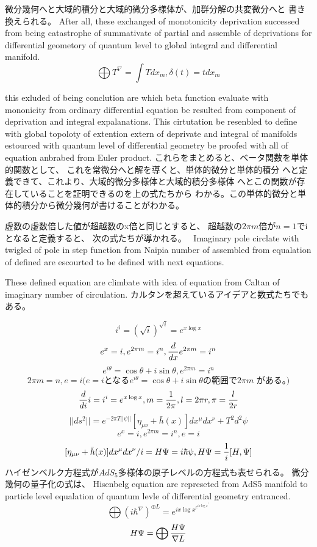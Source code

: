 \documentclass{jsarticle}
\begin{document}
   微分幾何へと大域的積分と大域的微分多様体が、加群分解の共変微分へと
   書き換えられる。
   After all, these exchanged of monotonicity deprivation successed from
   being catastrophe of summativate of partial and assemble of deprivations
   for differential geometory of quantum level to global integral and
   differential manifold.
   $$ \bigoplus T^{\nabla}  = \int T dx_m, \delta(t) = t dx_m  $$


   this exluded of being conclution are which beta function
   evaluate with mononicity from ordinary differential equation
   be resulted from component of deprivation and integral expalanations.
   This cirtutation be resenbled to define with global topoloty of
   extention extern of deprivate and integral of manifolds
   estourced with quantum level of differential geometry be proofed with
   all of equation anbrabed from Euler product.
   これらをまとめると、ベータ関数を単体的関数として、
   これを常微分へと解を導くと、単体的微分と単体的積分
   へと定義できて、これより、大域的微分多様体と大域的積分多様体
   へとこの関数が存在していることを証明できるのを上の式たちから
   わかる。この単体的微分と単体的積分から微分幾何が書けることがわかる。



   虚数の虚数倍した値が超越数のx倍と同じとすると、
   超越数の$2 \pi m$倍が$n=1$でiとなると定義すると、
   次の式たちが導かれる。　
   Imaginary pole circlate with twigled of pole in step function
   from Naipia number of assembled from equalation of defined are
   escourted to be defined with next equations.


   These defined equation are climbate with idea of equation from
   Caltan of imaginary number of circulation.
   カルタンを超えているアイデアと数式たちでもある。

   $$ i^i = (\sqrt{i})^{\sqrt{i}} = e^{x \log x} $$
   $$ e^x = i, e^{2\pi m} = i^n, {d \over d x}e^{2\pi m} = i^n $$
   $$ e^{i \theta} = \cos \theta + i \sin \theta, e^{2 \pi m} = i^n $$
   $$ 2 \pi m = n, e = i \text{($e=i$となる$e^{i \theta} = \cos \theta 
   + i \sin \theta $
   の範囲で$2\pi m$ がある。)}$$
   $$ {d \over d i}i = i^i = e^{x \log x}, m={1 \over 2 \pi},l=2\pi r, 
   \pi = {l \over 2r} $$
   $$ ||ds^2|| = e^{-2 \pi T||\psi||}[\eta_{\mu\nu} + \bar{h}(x)]
   dx^{\mu}dx^{\nu} + T^2 d^2 \psi $$
   $$ e^x = i, e^{2\pi m} = i^n, e = i $$
   $$ {{[\eta_{\mu\nu} + \bar{h}(x)]dx^{\mu}dx^{\nu}}/i} = H \Psi
   = i \hbar \psi, H \Psi = {1 \over i}[H, \Psi] $$
   ハイゼンベルク方程式が$ AdS_5 $多様体の原子レベルの方程式も表せられる。 
   微分幾何の量子化の式は、
   Hisenbelg equation are represeted from AdS5 manifold to particle level
   equalation of quantum levle of differential geometry entranced.
   $$ \bigoplus {({i \hbar} ^{\nabla})}^{\oplus L} = e^{{i x \log x}^{
	   {e^{i x \log x}}^{'}}} $$
    $$ H\Psi = \bigoplus {H \Psi \over \nabla L} $$
\end{document}
